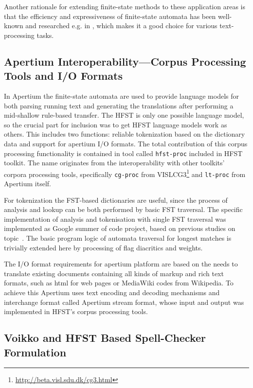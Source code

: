 \documentclass{llncs}
\begin{document}
Another rationale for extending finite-state methods to these application areas
is that the efficiency and expressiveness of finite-state automata has been
well-known and researched e.g. in \cite{aho/2007}, which makes it a good choice
for various text-processing tasks.

\subsection{Apertium Interoperability---Corpus Processing Tools and I/O Formats}

In Apertium the finite-state automata are used to provide language models for
both parsing running text and generating the translations after performing
a mid-shallow rule-based transfer. The HFST is only one possible language
model, so the crucial part for inclusion was to get HFST language models
work as others. This includes two functions: reliable tokenization based on
the dictionary data and support for apertium I/O formats. The total
contribution of this corpus processing functionality is contained in tool
called \texttt{hfst-proc} included in HFST toolkit. The name originates from
the interoperability with other toolkits' corpora processing tools, specifically
\texttt{cg-proc} from VISLCG3\footnote{\url{http://beta.visl.sdu.dk/cg3.html}} and
\texttt{lt-proc} from Apertium itself.

For tokenization the FST-based dictionaries are useful, since the process of
analysis and lookup can be both performed by basic FST traversal. The specific
implementation of analysis and tokenisation with single FST traversal was
implemented as Google summer of code project, based on previous studies on
topic~\cite{garrido-alenda/2002}. The basic program logic of automata traversal
for longest matches is trivially extended here by processing of flag diacritics
and weights.

The I/O format requirements for apertium platform are based on the needs to
translate existing documents containing all kinds of markup and rich text
formats, such as html for web pages or MediaWiki codes from Wikipedia. To
achieve this Apertium uses text encoding and decoding mechanisms and
interchange format called Apertium stream format, whose input and output
was implemented in HFST's corpus processing tools.

\subsection{Voikko and HFST Based Spell-Checker Formulation}\label{spellcheck}
\end{document}
